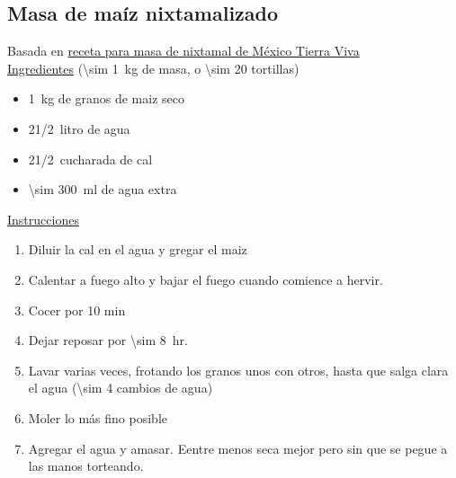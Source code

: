 \subsection{Masa de maíz nixtamalizado}
\label{receta:masa-maiz}

Basada en \href{https://mexicotierraviva.org/con-maiz-masa-de-nixtamal/}{receta para masa de nixtamal de México Tierra Viva}\\

\underline{Ingredientes} (\SI{\sim 1}{kg} de masa, o \num{\sim 20} tortillas)
\begin{itemize}
\item \SI{1}{kg} de granos de maiz seco
\item 2\SI{1/2}{litro} de agua
\item 2\SI{1/2}{cucharada} de cal
\item \SI{\sim 300}{ml} de agua extra
\end{itemize}

\underline{Instrucciones}
\begin{enumerate}
\item Diluir la cal en el agua y gregar el maiz
\item Calentar a fuego alto y bajar el fuego cuando comience a hervir.
\item Cocer por 10 min
\item Dejar reposar por \SI{\sim 8}{hr}.
\item Lavar varias veces, frotando los granos unos con otros, hasta que salga clara el agua (\num{\sim 4} cambios de agua)
\item Moler lo más fino posible
\item Agregar el agua y amasar. Eentre menos seca mejor pero sin que se pegue a las manos torteando. 
\end{enumerate}
